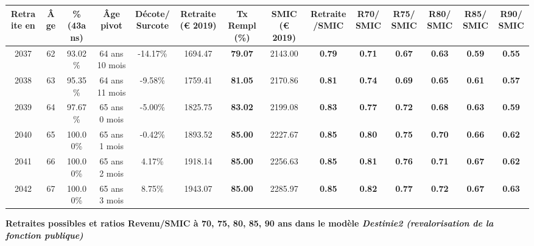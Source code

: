 \begin{adjustbox}{max width=\textwidth} 
\begin{tabular}[htb]{|c|c||c|c|c||c|c||c|c||c|c|c|c|c|} 
\hline 
 Retraite en &  Âge &  \%(43ans) &  Âge pivot &  Décote/Surcote &  Retraite (\euro{} 2019) &  Tx Rempl(\%) &  SMIC (\euro{} 2019) &  Retraite/SMIC &  R70/SMIC &  R75/SMIC &  R80/SMIC &  R85/SMIC &  R90/SMIC \\ 
\hline \hline 
 2037 &  62 &  93.02\% &  64 ans 10 mois &  -14.17\% &  1694.47 &  {\bf 79.07} &  2143.00 &  {\bf {\color{red} 0.79}} &  {\bf {\color{red} 0.71}} &  {\bf {\color{red} 0.67}} &  {\bf {\color{red} 0.63}} &  {\bf {\color{red} 0.59}} &  {\bf {\color{red} 0.55}} \\ 
\hline 
 2038 &  63 &  95.35\% &  64 ans 11 mois &  -9.58\% &  1759.41 &  {\bf 81.05} &  2170.86 &  {\bf {\color{red} 0.81}} &  {\bf {\color{red} 0.74}} &  {\bf {\color{red} 0.69}} &  {\bf {\color{red} 0.65}} &  {\bf {\color{red} 0.61}} &  {\bf {\color{red} 0.57}} \\ 
\hline 
 2039 &  64 &  97.67\% &  65 ans 0 mois &  -5.00\% &  1825.75 &  {\bf 83.02} &  2199.08 &  {\bf {\color{red} 0.83}} &  {\bf {\color{red} 0.77}} &  {\bf {\color{red} 0.72}} &  {\bf {\color{red} 0.68}} &  {\bf {\color{red} 0.63}} &  {\bf {\color{red} 0.59}} \\ 
\hline 
 2040 &  65 &  100.00\% &  65 ans 1 mois &  -0.42\% &  1893.52 &  {\bf 85.00} &  2227.67 &  {\bf {\color{red} 0.85}} &  {\bf {\color{red} 0.80}} &  {\bf {\color{red} 0.75}} &  {\bf {\color{red} 0.70}} &  {\bf {\color{red} 0.66}} &  {\bf {\color{red} 0.62}} \\ 
\hline 
 2041 &  66 &  100.00\% &  65 ans 2 mois &  4.17\% &  1918.14 &  {\bf 85.00} &  2256.63 &  {\bf {\color{red} 0.85}} &  {\bf {\color{red} 0.81}} &  {\bf {\color{red} 0.76}} &  {\bf {\color{red} 0.71}} &  {\bf {\color{red} 0.67}} &  {\bf {\color{red} 0.62}} \\ 
\hline 
 2042 &  67 &  100.00\% &  65 ans 3 mois &  8.75\% &  1943.07 &  {\bf 85.00} &  2285.97 &  {\bf {\color{red} 0.85}} &  {\bf {\color{red} 0.82}} &  {\bf {\color{red} 0.77}} &  {\bf {\color{red} 0.72}} &  {\bf {\color{red} 0.67}} &  {\bf {\color{red} 0.63}} \\ 
\hline 
\hline 
\end{tabular} 
\end{adjustbox} 
 
 \vspace{0.1cm} 
{\bf \noindent Retraites possibles et ratios Revenu/SMIC à 70, 75, 80, 85, 90 ans dans le modèle \emph{Destinie2 (revalorisation de la fonction publique)}}  
 
